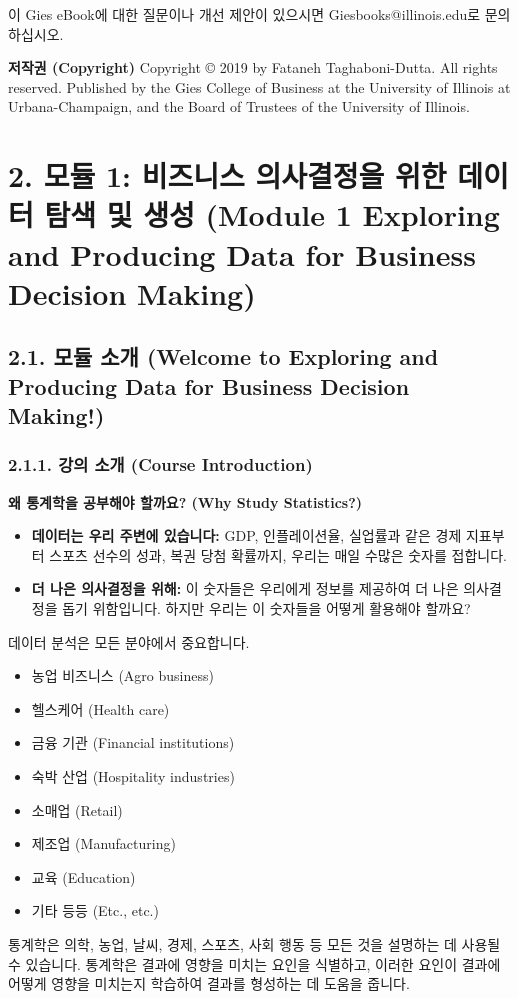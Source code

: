 \documentclass[11pt,a4paper]{article}
\begin{document}
이 Gies eBook에 대한 질문이나 개선 제안이 있으시면 Giesbooks@illinois.edu로 문의하십시오.

\textbf{저작권 (Copyright)}
Copyright © 2019 by Fataneh Taghaboni-Dutta. All rights reserved.
Published by the Gies College of Business at the University of Illinois at Urbana-Champaign, and the Board of Trustees of the University of Illinois.

\newpage
\section{2. 모듈 1: 비즈니스 의사결정을 위한 데이터 탐색 및 생성 (Module 1 Exploring and Producing Data for Business Decision Making)}

\subsection{2.1. 모듈 소개 (Welcome to Exploring and Producing Data for Business Decision Making!)}

\subsubsection{2.1.1. 강의 소개 (Course Introduction)}

\begin{examplebox}
\textbf{왜 통계학을 공부해야 할까요? (Why Study Statistics?)}
\begin{itemize}
    \item \textbf{데이터는 우리 주변에 있습니다:} GDP, 인플레이션율, 실업률과 같은 경제 지표부터 스포츠 선수의 성과, 복권 당첨 확률까지, 우리는 매일 수많은 숫자를 접합니다.
    \item \textbf{더 나은 의사결정을 위해:} 이 숫자들은 우리에게 정보를 제공하여 더 나은 의사결정을 돕기 위함입니다. 하지만 우리는 이 숫자들을 어떻게 활용해야 할까요?
\end{itemize}
\end{examplebox}

\begin{tcolorbox}[title={데이터 분석의 중요성}, colback=white, colframe=black!20!white]
데이터 분석은 모든 분야에서 중요합니다.
\begin{itemize}
    \item 농업 비즈니스 (Agro business)
    \item 헬스케어 (Health care)
    \item 금융 기관 (Financial institutions)
    \item 숙박 산업 (Hospitality industries)
    \item 소매업 (Retail)
    \item 제조업 (Manufacturing)
    \item 교육 (Education)
    \item 기타 등등 (Etc., etc.)
\end{itemize}
통계학은 의학, 농업, 날씨, 경제, 스포츠, 사회 행동 등 모든 것을 설명하는 데 사용될 수 있습니다. 통계학은 결과에 영향을 미치는 요인을 식별하고, 이러한 요인이 결과에 어떻게 영향을 미치는지 학습하여 결과를 형성하는 데 도움을 줍니다.
\end{tcolorbox}
\end{document}
